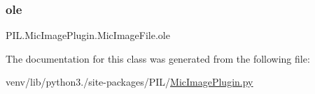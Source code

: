 \mbox{\label{classPIL_1_1MicImagePlugin_1_1MicImageFile_ad963ac3b329f284367a9c2ea609e22f0}} 
\subsubsection{\texorpdfstring{ole}{ole}}
{\footnotesize\ttfamily P\+I\+L.\+Mic\+Image\+Plugin.\+Mic\+Image\+File.\+ole}



The documentation for this class was generated from the following file\+:\begin{DoxyCompactItemize}
\item 
venv/lib/python3./site-\/packages/\+P\+I\+L/\hyperlink{MicImagePlugin_8py}{Mic\+Image\+Plugin.\+py}\end{DoxyCompactItemize}
